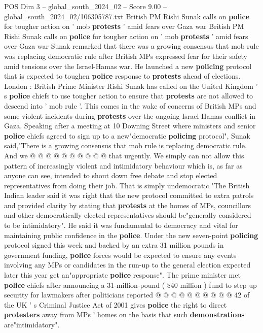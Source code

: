 \begin{textsample}{POS Dim 3 – global\_south\_2024\_02 – Score 9.00 – global\_south\_2024\_02/106305787.txt}  \label{ex:f3_pos_360}
British PM Rishi Sunak calls on \textbf{police} for tougher action on ' mob \textbf{protests} ' amid fears over Gaza war British PM Rishi Sunak calls on \textbf{police} for tougher action on ' mob \textbf{protests} ' amid fears over Gaza war Sunak remarked that there was a growing consensus that mob rule was replacing democratic rule after British MPs expressed fear for their safety amid tensions over the Israel-Hamas war.
He launched a new \textbf{policing} protocol that is expected to toughen \textbf{police} response to \textbf{protests} ahead of elections.
London : British Prime Minister Rishi Sunak has called on the United Kingdom ' s \textbf{police} chiefs to use tougher action to ensure that \textbf{protests} are not allowed to descend into ' mob rule '.
This comes in the wake of concerns of British MPs and some violent incidents during \textbf{protests} over the ongoing Israel-Hamas conflict in Gaza.
Speaking after a meeting at 10 Downing Street where ministers and senior \textbf{police} chiefs agreed to sign up to a new"democratic \textbf{policing} protocol", Sunak said,"There is a growing consensus that mob rule is replacing democratic rule.
And we @ @ @ @ @ @ @ @ @ @ that urgently.
We simply can not allow this pattern of increasingly violent and intimidatory behaviour which is, as far as anyone can see, intended to shout down free debate and stop elected representatives from doing their job.
That is simply undemocratic."The British Indian leader said it was right that the new protocol committed to extra patrols and provided clarity by stating that \textbf{protests} at the homes of MPs, councillors and other democratically elected representatives should be"generally considered to be intimidatory".
He said it was fundamental to democracy and vital for maintaining public confidence in the \textbf{police}.
Under the new seven-point \textbf{policing} protocol signed this week and backed by an extra 31 million pounds in government funding, \textbf{police} forces would be expected to ensure any events involving any MPs or candidates in the run-up to the general election expected later this year get an"appropriate \textbf{police} response".
The prime minister met \textbf{police} chiefs after announcing a 31-million-pound ( \$40 million ) fund to step up security for lawmakers after politicians reported @ @ @ @ @ @ @ @ @ @ 42 of the UK ' s Criminal Justice Act of 2001 gives \textbf{police} the right to direct \textbf{protesters} away from MPs ' homes on the basis that such \textbf{demonstrations} are"intimidatory".

\end{textsample}

